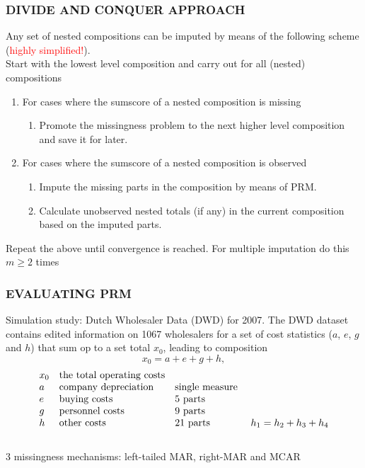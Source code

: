 \documentclass[aspectratio=169]{beamer} %
\begin{document}
\begin{frame}
  \frametitle{DIVIDE AND CONQUER APPROACH}
Any set of nested compositions can be imputed by means of the following scheme (\textcolor{red}{highly simplified!}). 
\newline \\
Start with the lowest level composition and carry out for all (nested) compositions
\begin{enumerate}
\item For cases where the sumscore of a nested composition is missing
	\begin{enumerate}
	\item Promote the missingness problem to the next higher level composition and save it for later. 
	\end{enumerate}
\item For cases where the sumscore of a nested composition is observed
	\begin{enumerate}
	\item Impute the missing parts in the composition by means of PRM.
	\item Calculate unobserved nested totals (if any) in the current composition based on the imputed parts.
	\end{enumerate}
\end{enumerate}
Repeat the above until convergence is reached. For multiple imputation do this $m\geq2$ times

\end{frame}

\begin{frame}
  \frametitle{EVALUATING PRM}
Simulation study: Dutch Wholesaler Data (DWD) for 2007. The DWD dataset contains edited information on 1067 wholesalers for a set of cost statistics ($a$, $e$, $g$ and $h$) that sum op to a set total $x_0$, leading to composition
\begin{equation*}
x_0=a+e+g+h,
\end{equation*}
\begin{equation*}
\begin{array}{llll}
x_0 &\textnormal{the total operating costs}&&\\
a &\textnormal{company depreciation} &\textnormal{single measure}&\\
e &\textnormal{buying costs} &\textnormal{5 parts}&\\
g &\textnormal{personnel costs} &\textnormal{9 parts}&\\
h &\textnormal{other costs}  &\textnormal{21 parts} &\textnormal{ $h_1=h_2+h_3+h_4$}\\
\end{array}
\end{equation*}
\newline \\
3 missingness mechanisms: left-tailed MAR, right-MAR and MCAR
\end{frame}
\end{document}
